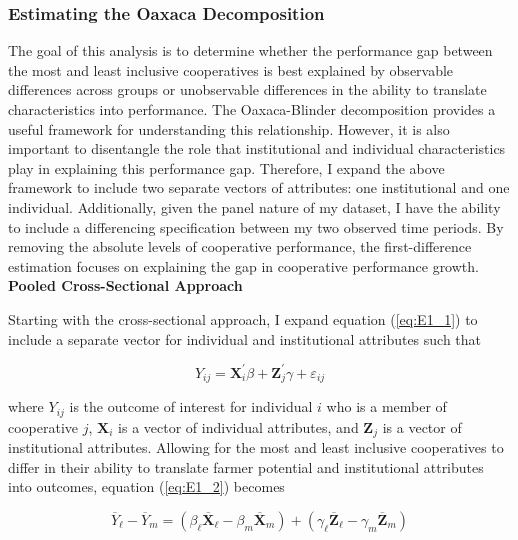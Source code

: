 \documentclass[11pt]{article}
\begin{document}
\subsubsection{Estimating the Oaxaca Decomposition} \label{sec:E1_est}

The goal of this analysis is to determine whether the performance gap between the most and least inclusive cooperatives is best explained by observable differences across groups or unobservable differences in the ability to translate characteristics into performance. The Oaxaca-Blinder decomposition provides a useful framework for understanding this relationship. However, it is also important to disentangle the role that institutional and individual characteristics play in explaining this performance gap. Therefore, I expand the above framework to include two separate vectors of attributes: one institutional and one individual. Additionally, given the panel nature of my dataset, I have the ability to include a differencing specification between my two observed time periods. By removing the absolute levels of cooperative performance, the first-difference estimation focuses on explaining the gap in cooperative performance growth. \\

\noindent \textbf{Pooled Cross-Sectional Approach}

Starting with the cross-sectional approach, I expand equation (\ref{eq:E1_1}) to include a separate vector for individual and institutional attributes such that

\begin{equation} \label{eq:E1_4}
   Y_{ij} = \mathbf{X}_i^{\prime}\beta + \mathbf{Z}_j^{\prime}\gamma + \varepsilon_{ij}
\end{equation}  

where $Y_{ij}$ is the outcome of interest for individual $i$ who is a member of cooperative $j$, $\mathbf{X}_i$ is a vector of individual attributes, and $\mathbf{Z}_j$ is a vector of institutional attributes. Allowing for the most and least inclusive cooperatives to differ in their ability to translate farmer potential and institutional attributes into outcomes, equation (\ref{eq:E1_2}) becomes

\begin{equation} \label{eq:E1_5}
        \overline{Y}_{\ell} - \overline{Y}_{m} =  (\beta_{\ell}\overline{\mathbf{X}}_{\ell} - \beta_{m}\overline{\mathbf{X}}_{m}) + (\gamma_{\ell}\overline{\mathbf{Z}}_{\ell} - \gamma_{m}\overline{\mathbf{Z}}_{m})
\end{equation}  
\end{document}
